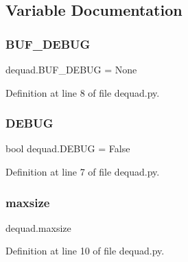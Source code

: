\subsection{Variable Documentation}
\mbox{\label{namespacedequad_a7f2d7b33e38c6d5249b152740f656344}} 
\subsubsection{\texorpdfstring{B\+U\+F\+\_\+\+D\+E\+B\+UG}{BUF\_DEBUG}}
{\footnotesize\ttfamily dequad.\+B\+U\+F\+\_\+\+D\+E\+B\+UG = None}



Definition at line 8 of file dequad.\+py.

\mbox{\label{namespacedequad_a19fc97d6e01fffb74ca81c02a51d86c0}} 
\subsubsection{\texorpdfstring{D\+E\+B\+UG}{DEBUG}}
{\footnotesize\ttfamily bool dequad.\+D\+E\+B\+UG = False}



Definition at line 7 of file dequad.\+py.

\mbox{\label{namespacedequad_aecd7501e851b01ca793cb5b896fa5141}} 
\subsubsection{\texorpdfstring{maxsize}{maxsize}}
{\footnotesize\ttfamily dequad.\+maxsize}



Definition at line 10 of file dequad.\+py.

